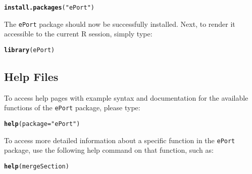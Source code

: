 \documentclass{article}\usepackage[]{graphicx}\usepackage[]{color}
\makeatletter
\newcommand{\hlstr}[1]{\textcolor[rgb]{0.192,0.494,0.8}{#1}}%
\newcommand{\hlstd}[1]{\textcolor[rgb]{0.345,0.345,0.345}{#1}}%
\newcommand{\hlkwc}[1]{\textcolor[rgb]{0.333,0.667,0.333}{#1}}%
\newcommand{\hlkwd}[1]{\textcolor[rgb]{0.737,0.353,0.396}{\textbf{#1}}}%
\newenvironment{kframe}{%
 \def\at@end@of@kframe{}%
 \ifinner\ifhmode%
  \def\at@end@of@kframe{\end{minipage}}%
  \begin{minipage}{\columnwidth}%
 \fi\fi%
 \def\FrameCommand##1{\hskip\@totalleftmargin \hskip-\fboxsep
 \colorbox{shadecolor}{##1}\hskip-\fboxsep
     \hskip-\linewidth \hskip-\@totalleftmargin \hskip\columnwidth}%
 \MakeFramed {\advance\hsize-\width
   \@totalleftmargin\z@ \linewidth\hsize
   \@setminipage}}%
 {\par\unskip\endMakeFramed%
 \at@end@of@kframe}
\newenvironment{knitrout}{}{} %
\numberwithin{equation}{section} %
\newcommand{\pkg}[1]{{\texttt{#1}}}
\newcommand{\R}{{\normalfont\textsf{R }}{}}
\makeatother
\begin{document}
\begin{knitrout}
\color{fgcolor}\begin{kframe}
\begin{alltt}
\hlkwd{install.packages}\hlstd{(}\hlstr{"ePort"}\hlstd{)}
\end{alltt}
\end{kframe}
\end{knitrout}

\noindent
The \pkg{ePort} package should now be successfully installed. Next, to render it accessible to the current \R session, simply type:

\begin{knitrout}
\color{fgcolor}\begin{kframe}
\begin{alltt}
\hlkwd{library}\hlstd{(ePort)}
\end{alltt}
\end{kframe}
\end{knitrout}

\subsection{Help Files}

To access help pages with example syntax and documentation for the available functions of the \pkg{ePort} package, please type:

\begin{knitrout}
\color{fgcolor}\begin{kframe}
\begin{alltt}
\hlkwd{help}\hlstd{(}\hlkwc{package}\hlstd{=}\hlstr{"ePort"}\hlstd{)}
\end{alltt}
\end{kframe}
\end{knitrout}

To access more detailed information about a specific function in the \pkg{ePort} package, use the following help command on that function, such as:

\begin{knitrout}
\color{fgcolor}\begin{kframe}
\begin{alltt}
\hlkwd{help}\hlstd{(mergeSection)}
\end{alltt}
\end{kframe}
\end{knitrout}
\end{document}
